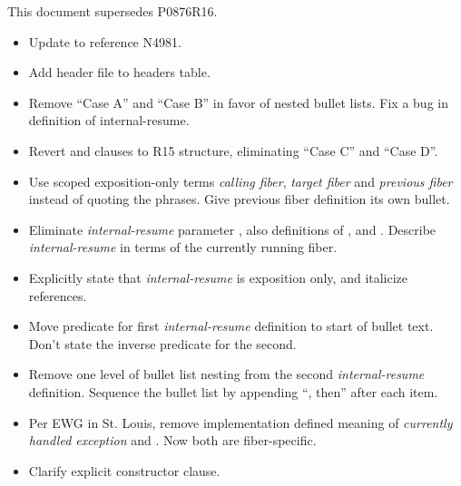 \label{history}
This document supersedes P0876R16.


\begin{itemize}
    \item Update to reference N4981.
    \item Add  header file to headers table.
    \item Remove \resumewith ``Case A'' and ``Case B'' in favor of
          nested bullet lists. Fix a bug in definition of internal-resume.
    \item Revert \resumewith\xspace\returns and \except clauses to R15
          structure, eliminating ``Case C'' and ``Case D''.
    \item Use scoped exposition-only terms \emph{calling fiber}, \emph{target
          fiber} and \emph{previous fiber} instead of quoting the phrases.
          Give previous fiber definition its own bullet.
    \item Eliminate \emph{internal-resume} parameter , also
          definitions of , 
          and . Describe \emph{internal-resume} in
          terms of the currently running fiber.
    \item Explicitly state that \emph{internal-resume} is exposition only, and
          italicize references.
    \item Move predicate for first \emph{internal-resume} definition to start
          of bullet text. Don't state the inverse predicate for the second.
    \item Remove one level of bullet list nesting from the
          second \emph{internal-resume} definition. Sequence the bullet list
          by appending ``, then'' after each item.
    \item Per EWG in St. Louis, remove implementation defined meaning
          of \emph{currently handled exception} and .
          Now both are fiber-specific.
    \item Clarify explicit constructor \except clause.
\end{itemize}


